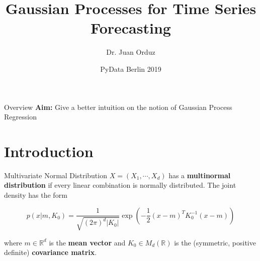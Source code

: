\documentclass[10pt]{beamer}
\title[Gaussian Processes for Time Series Forecasting] %
{Gaussian Processes for Time Series Forecasting}
\author[Dr. Juan Orduz] %
{Dr. Juan Orduz}
\institute[PyData Berlin 2019] %
{

}
\date[ PyData Berlin 2019] %
{ PyData Berlin 2019}
\begin{document}
\begin{frame}
  \titlepage
\end{frame}


\begin{frame}{Overview}
{{\bf Aim:} Give a better intuition on the notion of Gaussian Process Regression}
\tableofcontents
\end{frame}

\section{Introduction}

\begin{frame}{Multivariate Normal Distribution}{\cite{multivariate_normal_orduz_2019}}
$X = (X_1, \cdots, X_d)$ has a{ \bf multinormal distribution} if every linear combination is normally distributed. The joint density has the form

$$
p(x|m,K_0) =\frac{1}{\sqrt{(2\pi)^{d}|K_0|}}\exp\left(-\frac{1}{2}(x - m)^T K_0^{-1}(x - m)\right)
$$

where $m \in \mathbb{R}^d$ is the {\bf mean vector} and  $K_0 \in M_d(\mathbb{R})$ is the (symmetric, positive definite) {\bf covariance matrix}.


\end{frame}
\end{document}
